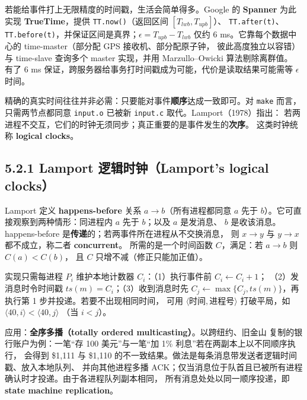 \begin{ideabox}
若能给事件打上无限精度的时间戳，生活会简单得多。Google 的 \textbf{Spanner} 为此实现
\textbf{TrueTime}，提供 \texttt{TT.now()}（返回区间 $[T_{lwb}, T_{upb}]$）、
\texttt{TT.after(t)}、\texttt{TT.before(t)}，并保证区间是真界；$\epsilon = T_{upb}-T_{lwb}$
仅约 6 ms。它靠每个数据中心的 time-master（部分配 GPS 接收机、部分配原子钟，
彼此高度独立以容错）与 time-slave 查询多个 master 实现，并用 Marzullo--Owicki 算法剔除离群值。
有了 6 ms 保证，跨服务器给事务打时间戳成为可能，代价是读取结果可能需等 $\epsilon$ 时间。
\end{ideabox}



精确的真实时间往往并非必需：只要能对事件\textbf{顺序}达成一致即可。对 \texttt{make} 而言，
只需两节点都同意 \texttt{input.o} 已被新 \texttt{input.c} 取代。Lamport（1978）指出：
若两进程不交互，它们的时钟无须同步；真正重要的是事件发生的\textbf{次序}。
这类时钟统称 \textbf{logical clocks}。

\subsection*{5.2.1 Lamport 逻辑时钟（Lamport's logical clocks）}

Lamport 定义 \textbf{happens-before} 关系 $a \rightarrow b$（所有进程都同意
$a$ 先于 $b$）。它可直接观察到两种情形：同进程内 $a$ 先于 $b$；以及 $a$ 是发消息、
$b$ 是收该消息。happens-before 是\textbf{传递}的；若两事件所在进程从不交换消息，
则 $x \rightarrow y$ 与 $y \rightarrow x$ 都不成立，称二者 \textbf{concurrent}。
所需的是一个时间函数 $C$，满足：若 $a \rightarrow b$ 则 $C(a) < C(b)$，
且 $C$ 只增不减（修正只能加正值）。

实现只需每进程 $P_i$ 维护本地计数器 $C_i$：（1）执行事件前 $C_i \leftarrow C_i + 1$；
（2）发消息时令时间戳 $ts(m) = C_i$；（3）收到消息时先
$C_j \leftarrow \max\{C_j, ts(m)\}$，再执行第 1 步并投递。若要不出现相同时间，
可用 $\langle \text{时间}, \text{进程号} \rangle$ 打破平局，如 $\langle 40, i\rangle < \langle 40, j\rangle$
（当 $i<j$）。

\medskip\noindent 应用：\textbf{全序多播（totally ordered multicasting）}。以跨纽约、旧金山
复制的银行账户为例：一笔“存 100 美元”与一笔“加 1\% 利息”若在两副本上以不同顺序执行，
会得到 \$1,111 与 \$1,110 的不一致结果。做法是每条消息带发送者逻辑时间戳、放入本地队列、
并向其他进程多播 ACK；仅当消息位于队首且已被所有进程确认时才投递。由于各进程队列副本相同，
所有消息处处以同一顺序投递，即 \textbf{state machine replication}。

